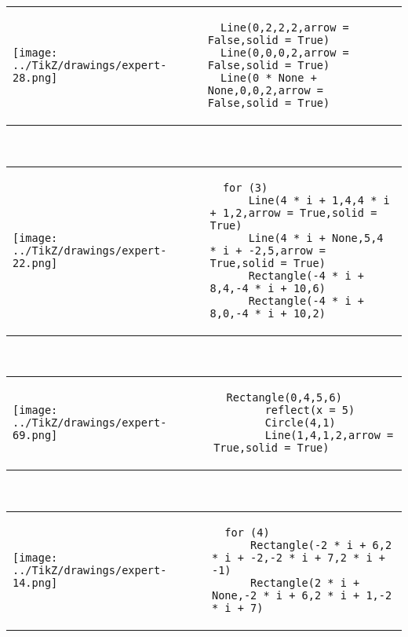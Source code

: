         \begin{tabular}{ll}
\texttt{[image: ../TikZ/drawings/expert-28.png]}&
        \begin{minipage}{10cm}
        \begin{verbatim}
  Line(0,2,2,2,arrow = False,solid = True)
  Line(0,0,0,2,arrow = False,solid = True)
  Line(0 * None + None,0,0,2,arrow = False,solid = True)
        \end{verbatim}
\end{minipage}
\end{tabular}        
        \\

        \begin{tabular}{ll}
\texttt{[image: ../TikZ/drawings/expert-22.png]}&
        \begin{minipage}{10cm}
        \begin{verbatim}
  for (3)
      Line(4 * i + 1,4,4 * i + 1,2,arrow = True,solid = True)
      Line(4 * i + None,5,4 * i + -2,5,arrow = True,solid = True)
      Rectangle(-4 * i + 8,4,-4 * i + 10,6)
      Rectangle(-4 * i + 8,0,-4 * i + 10,2)
        \end{verbatim}
\end{minipage}
\end{tabular}        
        \\

        \begin{tabular}{ll}
\texttt{[image: ../TikZ/drawings/expert-69.png]}&
        \begin{minipage}{10cm}
        \begin{verbatim}
  Rectangle(0,4,5,6)
        reflect(x = 5)
        Circle(4,1)
        Line(1,4,1,2,arrow = True,solid = True)
        \end{verbatim}
\end{minipage}
\end{tabular}        
        \\

        \begin{tabular}{ll}
\texttt{[image: ../TikZ/drawings/expert-14.png]}&
        \begin{minipage}{10cm}
        \begin{verbatim}
  for (4)
      Rectangle(-2 * i + 6,2 * i + -2,-2 * i + 7,2 * i + -1)
      Rectangle(2 * i + None,-2 * i + 6,2 * i + 1,-2 * i + 7)
        \end{verbatim}
\end{minipage}
\end{tabular}        
        \\


